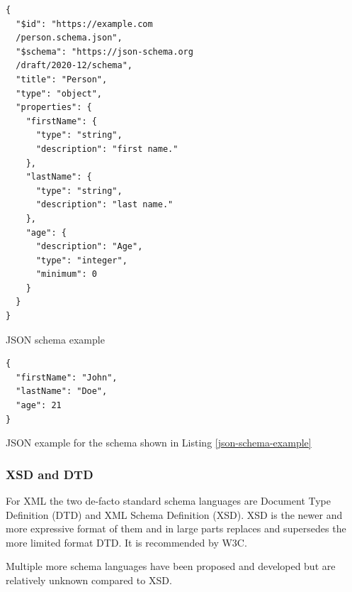 \begin{listing}[!h]
    \begin{verbatim}
{
  "$id": "https://example.com
  /person.schema.json",
  "$schema": "https://json-schema.org
  /draft/2020-12/schema",
  "title": "Person",
  "type": "object",
  "properties": {
    "firstName": {
      "type": "string",
      "description": "first name."
    },
    "lastName": {
      "type": "string",
      "description": "last name."
    },
    "age": {
      "description": "Age",
      "type": "integer",
      "minimum": 0
    }
  }
}
    \end{verbatim}
    \caption{JSON schema example}
    \label{json-schema-example}
\end{listing}


\begin{listing}[!h]
    \begin{verbatim}
{
  "firstName": "John",
  "lastName": "Doe",
  "age": 21
}
    \end{verbatim}
    \caption{JSON example for the schema shown in Listing \ref{json-schema-example}}
    \label{json-example}
\end{listing}

\subsubsection{XSD and DTD}
For XML the two de-facto standard schema languages are Document Type Definition (DTD)\cite{dtd_spec} and XML Schema Definition (XSD)\cite{xsd_spec}.
XSD is the newer and more expressive format of them and in large parts replaces and supersedes the more limited format DTD\cite{dtd_vs_xsd}.
It is recommended by W3C\cite{xsd_spec}.

Multiple more schema languages have been proposed and developed but are relatively unknown compared to XSD\cite{xml_schemas_1,xml_schemas_2}.

